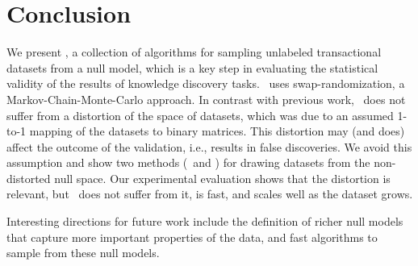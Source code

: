 \chapter{Conclusion}\label{sec:concl}

We present \algo, a collection of algorithms for sampling unlabeled
transactional datasets from a null model, which is a key step in evaluating the
statistical validity of the results of knowledge discovery tasks. \algo\ uses
swap-randomization, a Markov-Chain-Monte-Carlo approach. In contrast with
previous work, \algo\ does not suffer from a distortion of the space of
datasets, which was due to an assumed 1-to-1 mapping of the datasets to binary
matrices. This distortion may (and does) affect the outcome of the validation,
i.e., results in false discoveries. We avoid this assumption and show two
methods (\naivealgo\ and ) for drawing datasets from the non-distorted
null space. Our experimental evaluation shows that the distortion is relevant,
but \algo\ does not suffer from it, is fast, and scales well as the dataset
grows.

Interesting directions for future work include the definition of richer null
models that capture more important properties of the data, and fast algorithms
to sample from these null models.
